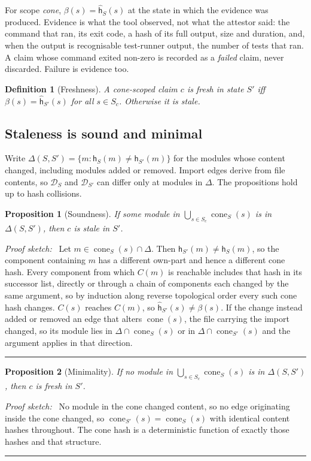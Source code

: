 \documentclass[conference]{IEEEtran}
\newtheorem{proposition}{Proposition}
\newtheorem{definition}{Definition}
\newenvironment{proof}[1][Proof]{\par\noindent\textit{#1:}\ \ignorespaces}{\hfill\rule{0.45em}{0.45em}\par}
\newcommand{\cone}{\operatorname{cone}}
\newcommand{\hash}{\mathsf{h}}
\newcommand{\chash}{\hat{\mathsf{h}}}
\newcommand{\Deps}{\mathcal{D}}
\begin{document}
For scope \emph{cone}, $\beta(s) = \chash_S(s)$ at the state in which the evidence was produced. Evidence is what the tool observed, not what the attestor said: the command that ran, its exit code, a hash of its full output, size and duration, and, when the output is recognisable test-runner output, the number of tests that ran. A claim whose command exited non-zero is recorded as a \emph{failed} claim, never discarded. Failure is evidence too.

\begin{definition}[Freshness]
A cone-scoped claim $c$ is fresh in state $S'$ iff $\beta(s) = \chash_{S'}(s)$ for all $s \in S_c$. Otherwise it is stale.
\end{definition}

\subsection{Staleness is sound and minimal}

Write $\Delta(S, S') = \{m : \hash_S(m) \neq \hash_{S'}(m)\}$ for the modules whose content changed, including modules added or removed. Import edges derive from file contents, so $\Deps_S$ and $\Deps_{S'}$ can differ only at modules in $\Delta$. The propositions hold up to hash collisions.

\begin{proposition}[Soundness]
\label{prop:sound}
If some module in $\bigcup_{s \in S_c} \cone_S(s)$ is in $\Delta(S, S')$, then $c$ is stale in $S'$.
\end{proposition}
\begin{proof}[Proof sketch]
Let $m \in \cone_S(s) \cap \Delta$. Then $\hash_{S'}(m) \neq \hash_S(m)$, so the component containing $m$ has a different own-part and hence a different cone hash. Every component from which $C(m)$ is reachable includes that hash in its successor list, directly or through a chain of components each changed by the same argument, so by induction along reverse topological order every such cone hash changes. $C(s)$ reaches $C(m)$, so $\chash_{S'}(s) \neq \beta(s)$. If the change instead added or removed an edge that alters $\cone(s)$, the file carrying the import changed, so its module lies in $\Delta \cap \cone_S(s)$ or in $\Delta \cap \cone_{S'}(s)$ and the argument applies in that direction.
\end{proof}

\begin{proposition}[Minimality]
\label{prop:minimal}
If no module in $\bigcup_{s \in S_c} \cone_S(s)$ is in $\Delta(S, S')$, then $c$ is fresh in $S'$.
\end{proposition}
\begin{proof}[Proof sketch]
No module in the cone changed content, so no edge originating inside the cone changed, so $\cone_{S'}(s) = \cone_S(s)$ with identical content hashes throughout. The cone hash is a deterministic function of exactly those hashes and that structure.
\end{proof}
\end{document}

